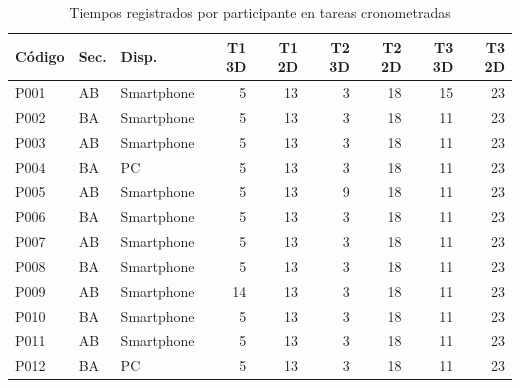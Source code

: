 \begin{table}[H]
    \caption{Tiempos registrados por participante en tareas cronometradas}
    \label{tab:tiempos_tareas_cronometradas_participante}
    \centering
    \scriptsize
    \singlespacing
    \setlength{\tabcolsep}{3pt}
    \begin{tabular}{p{1.1cm}p{0.8cm}p{1.7cm}rrrrrr}
        \hline
        \textbf{Código} & \textbf{Sec.} & \textbf{Disp.} & \textbf{T1 3D} & \textbf{T1 2D} & \textbf{T2 3D} & \textbf{T2 2D} & \textbf{T3 3D} & \textbf{T3 2D} \\ \hline
        P001 & AB & Smartphone & 5 & 13 & 3 & 18 & 15 & 23 \\
        P002 & BA & Smartphone & 5 & 13 & 3 & 18 & 11 & 23 \\
        P003 & AB & Smartphone & 5 & 13 & 3 & 18 & 11 & 23 \\
        P004 & BA & PC & 5 & 13 & 3 & 18 & 11 & 23 \\
        P005 & AB & Smartphone & 5 & 13 & 9 & 18 & 11 & 23 \\
        P006 & BA & Smartphone & 5 & 13 & 3 & 18 & 11 & 23 \\
        P007 & AB & Smartphone & 5 & 13 & 3 & 18 & 11 & 23 \\
        P008 & BA & Smartphone & 5 & 13 & 3 & 18 & 11 & 23 \\
        P009 & AB & Smartphone & 14 & 13 & 3 & 18 & 11 & 23 \\
        P010 & BA & Smartphone & 5 & 13 & 3 & 18 & 11 & 23 \\
        P011 & AB & Smartphone & 5 & 13 & 3 & 18 & 11 & 23 \\
        P012 & BA & PC & 5 & 13 & 3 & 18 & 11 & 23 \\ \hline
    \end{tabular}
    \par\vspace{0.5\baselineskip}
\end{table}

